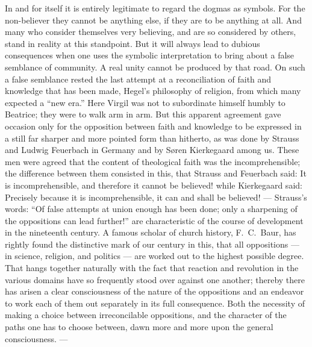 \documentclass[12pt,a4paper]{article}
\begin{document}
In and for itself it is entirely legitimate to regard the dogmas as symbols.
For the non-believer they cannot be anything else, if they are to be anything
at all. And many who consider themselves very believing, and are so considered
by others, stand in reality at this standpoint. But it will always lead to
dubious consequences when one uses the symbolic interpretation to bring about
a false semblance of community. A real unity cannot be produced by that road.
On such a false semblance rested the last attempt at a reconciliation of faith
and knowledge that has been made, Hegel's philosophy of religion, from which
many expected a ``new era.'' Here Virgil was not to subordinate himself humbly
to Beatrice; they were to walk arm in arm. But this apparent agreement gave
occasion only for the opposition between faith and knowledge to be expressed
in a still far sharper and more pointed form than hitherto, as was done by
Strauss and Ludwig Feuerbach in Germany and by Søren Kierkegaard among us.
These men were agreed that the content of theological faith was the
incomprehensible; the difference between them consisted in this, that Strauss
and Feuerbach said: It is incomprehensible, and therefore it cannot be
believed! while Kierkegaard said: Precisely because it is incomprehensible, it
can and shall be believed! --- Strauss's words: ``Of false attempts at union
enough has been done; only a sharpening of the oppositions can lead further!''
are characteristic of the course of development in the nineteenth century. A
famous scholar of church history, F.~C.~Baur, has rightly found the
distinctive mark of our century in this, that all oppositions --- in science,
religion, and politics --- are worked out to the highest possible degree. That
hangs together naturally with the fact that reaction and revolution in the
various domains have so frequently stood over against one another; thereby
there has arisen a clear consciousness of the nature of the oppositions and an
endeavor to work each of them out separately in its full consequence. Both the
necessity of making a choice between irreconcilable oppositions, and the
character of the paths one has to choose between, dawn more and more upon the
general consciousness. ---
\end{document}
